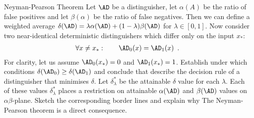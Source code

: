 \documentclass{crypto-exercise}
\author{Sven Laur}
\begin{document}
\begin{exercise}{Neyman-Pearson Theorem}
Let $\AD$ be a distinguisher, let $\alpha(A)$ be the ratio of false positives and let $\beta(\alpha)$ be the ratio of false negatives. 
Then we can define a weighted average $\delta(\AD)=\lambda \alpha(\AD)+(1-\lambda)\beta(\AD)$ for $\lambda\in [0,1]$.
Now consider two near-identical deterministic distinguishers which differ only on the input $x_*$:
\begin{align*}
\forall x\neq x_*:\qquad \AD_0(x)=\AD_1(x)\enspace.
\end{align*}
For clarity, let us assume  $\AD_0(x_*)= 0$ and $\AD_1(x_*)=1$. 
Establish under which conditions $\delta(\AD_0) \geq \delta(\AD_1)$ and conclude that describe the decision rule of a distinguisher that minimises $\delta$. 
Let $\delta_\lambda^*$ be the  attainable $\delta$ value for each $\lambda$.  Each of these values $\delta_\lambda^*$ places a restriction on attainable $\alpha(\AD)$ and $\beta(\AD)$ values on $\alpha\beta$-plane. Sketch the corresponding border lines and explain why The Neyman-Pearson theorem  is a direct consequence.  
\end{exercise}
\end{document}
